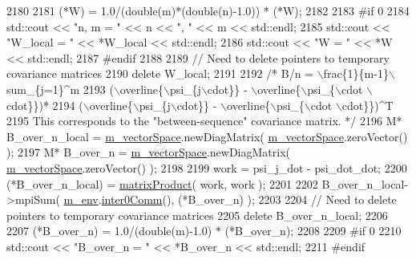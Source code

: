 \begin{DoxyCode}
2180 
2181       (*W) = 1.0/(double(m)*(double(n)-1.0)) * (*W);
2182 
2183 \textcolor{preprocessor}{#if 0}
2184 \textcolor{preprocessor}{}      std::cout << \textcolor{stringliteral}{"n, m = "} << n << \textcolor{stringliteral}{", "} << m << std::endl;
2185       std::cout << \textcolor{stringliteral}{"W\_local = "} << *W\_local << std::endl;
2186       std::cout << \textcolor{stringliteral}{"W = "} << *W << std::endl;
2187 \textcolor{preprocessor}{#endif}
2188 \textcolor{preprocessor}{}
2189       \textcolor{comment}{// Need to delete pointers to temporary covariance matrices}
2190       \textcolor{keyword}{delete} W\_local;
2191 
2192       \textcolor{comment}{/* B/n = \(\backslash\)frac\{1\}\{m-1\}\(\backslash\)sum\_\{j=1\}^m}
2193 \textcolor{comment}{   (\(\backslash\)overline\{\(\backslash\)psi\_\{j\(\backslash\)cdot\}\} - \(\backslash\)overline\{\(\backslash\)psi\_\{\(\backslash\)cdot \(\backslash\)cdot\}\})*}
2194 \textcolor{comment}{   (\(\backslash\)overline\{\(\backslash\)psi\_\{j\(\backslash\)cdot\}\} - \(\backslash\)overline\{\(\backslash\)psi\_\{\(\backslash\)cdot \(\backslash\)cdot\}\})^T}
2195 \textcolor{comment}{   This corresponds to the "between-sequence" covariance matrix. */}
2196       M* B\_over\_n\_local = \hyperlink{class_q_u_e_s_o_1_1_base_vector_sequence_a4bd171e39ed050ff105c808336f35198}{m\_vectorSpace}.newDiagMatrix( 
      \hyperlink{class_q_u_e_s_o_1_1_base_vector_sequence_a4bd171e39ed050ff105c808336f35198}{m\_vectorSpace}.zeroVector() );
2197       M* B\_over\_n = \hyperlink{class_q_u_e_s_o_1_1_base_vector_sequence_a4bd171e39ed050ff105c808336f35198}{m\_vectorSpace}.newDiagMatrix( \hyperlink{class_q_u_e_s_o_1_1_base_vector_sequence_a4bd171e39ed050ff105c808336f35198}{m\_vectorSpace}.zeroVector() );
2198 
2199       work = psi\_j\_dot - psi\_dot\_dot;
2200       (*B\_over\_n\_local) = \hyperlink{namespace_q_u_e_s_o_aea04e232d5d3dd76349a85bb8acf9e17}{matrixProduct}( work, work );
2201 
2202       B\_over\_n\_local->mpiSum( \hyperlink{class_q_u_e_s_o_1_1_base_vector_sequence_a8e8824d2a63c5a43bcc6473e3a0491e8}{m\_env}.\hyperlink{class_q_u_e_s_o_1_1_base_environment_a689e4d140c74d495d97eb498714a4b82}{inter0Comm}(), (*B\_over\_n) );
2203 
2204       \textcolor{comment}{// Need to delete pointers to temporary covariance matrices}
2205       \textcolor{keyword}{delete} B\_over\_n\_local;
2206 
2207       (*B\_over\_n) = 1.0/(double(m)-1.0) * (*B\_over\_n); 
2208 
2209 \textcolor{preprocessor}{#if 0}
2210 \textcolor{preprocessor}{}      std::cout << \textcolor{stringliteral}{"B\_over\_n = "} << *B\_over\_n << std::endl;
2211 \textcolor{preprocessor}{#endif}

\end{DoxyCode}
